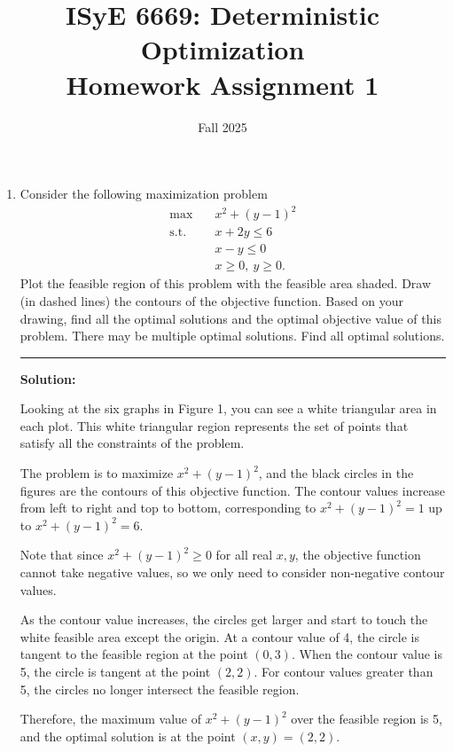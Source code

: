 \documentclass[11pt]{article}
\title{\Large\textbf{ISyE 6669: Deterministic Optimization}\\\vspace{0.3em}\large Homework Assignment 1}
\author{}
\date{Fall 2025}
\begin{document}
\maketitle
\thispagestyle{empty}
\vspace{-1em}


\begin{enumerate}[leftmargin=*, itemsep=1.5em]
\item Consider the following maximization problem
\begin{align*}
    \max\quad & x^2 + (y-1)^2 \\
\text{s.t.}\quad & x + 2y \le 6 \\
& x - y \le 0 \\
& x \ge 0,\ y \ge 0.
\end{align*}
Plot the feasible region of this problem with the feasible area shaded. Draw (in dashed lines) the contours of the objective function. Based on your 
drawing, find all the optimal solutions and the optimal objective value of this problem. There may be multiple optimal solutions. Find all optimal solutions.

\vspace{0.5em}
\noindent\rule{\textwidth}{0.5pt}
\vspace{0.5em}

\noindent\textbf{Solution:}


Looking at the six graphs in Figure 1, you can see a white triangular area in each plot. This white triangular region represents the set of points that satisfy all the constraints of the problem.

The problem is to maximize $x^2 + (y-1)^2$, and the black circles in the figures are the contours of this objective function. The contour values increase from left to right and top to bottom, corresponding to $x^2 + (y-1)^2 = 1$ up to $x^2 + (y-1)^2 = 6$.

Note that since $x^2 + (y-1)^2 \geq 0$ for all real $x, y$, the objective function cannot take negative values, so we only need to consider non-negative contour values.

As the contour value increases, the circles get larger and start to touch the white feasible area except the origin. At a contour value of 4, the circle is tangent to the feasible region at the point $(0, 3)$. When the contour value is 5, the circle is tangent at the point $(2, 2)$. For contour values greater than 5, the circles no longer intersect the feasible region.

Therefore, the maximum value of $x^2 + (y-1)^2$ over the feasible region is 5, and the optimal solution is at the point $(x, y) = (2, 2)$.








\end{enumerate}
\end{document}
